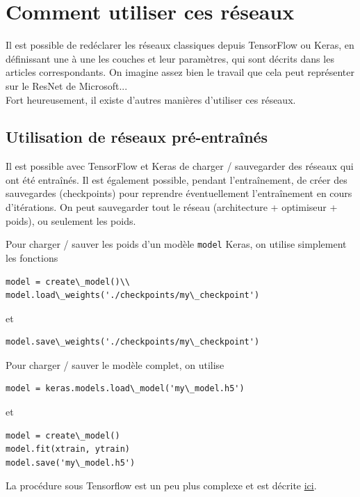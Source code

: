 \documentclass{DocBleu}
\begin{document}
\section{Comment utiliser ces réseaux}
Il est possible de redéclarer les réseaux classiques depuis TensorFlow ou Keras, en définissant une à une les couches et leur paramètres, qui sont décrits dans les articles correspondants. On imagine assez bien le travail que cela peut représenter sur le ResNet de Microsoft...\\
Fort heureusement, il existe d'autres manières d'utiliser ces réseaux.



\subsection{Utilisation de réseaux pré-entraînés}
Il est possible avec TensorFlow  et Keras de charger / sauvegarder des réseaux qui ont été entraînés.  Il est également possible, pendant l'entraînement, de créer des sauvegardes (checkpoints) pour reprendre éventuellement l'entraînement en cours d'itérations. On peut sauvegarder tout le réseau (architecture + optimiseur  + poids), ou seulement les poids.

Pour charger / sauver les poids d'un modèle {\tt model} Keras, on utilise simplement les fonctions 
\begin{lstlisting}
model = create\_model()\\
model.load\_weights('./checkpoints/my\_checkpoint')
\end{lstlisting}
et
\begin{lstlisting}
model.save\_weights('./checkpoints/my\_checkpoint')
\end{lstlisting}

Pour charger / sauver le modèle complet, on utilise  
\begin{lstlisting}
model = keras.models.load\_model('my\_model.h5')
\end{lstlisting}
et 
\begin{lstlisting}
model = create\_model()
model.fit(xtrain, ytrain)
model.save('my\_model.h5')
\end{lstlisting}


La procédure sous Tensorflow est un peu plus complexe et est décrite \href{https://www.tensorflow.org/guide/saved_model}{ici}.
\end{document}
